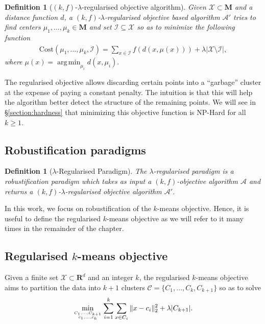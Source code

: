 \documentclass[12pt]{article}
\newcommand{\mc}{\mathcal}
\newcommand{\mb}{\mathbf}
\DeclareMathOperator*{\argmin}{arg\,min}
\newtheorem{definition}[theorem]{Definition}
\begin{document}
\begin{definition}[$(k, f)$-$\lambda$-regularised objective algorithm] Given $\mc X\subset \mb M$ and a distance function $d$, a $(k, f)$-$\lambda$-regularised objective based algorithm $\mc A'$ tries to find centers $\mu_1, \ldots, \mu_k \in \mb M$ and set $\mc I\subseteq \mc X$ so as to minimize the following function
\begin{align}
\label{eqn:kfObjectiveAlg}
\text{Cost}(\mu_1, \ldots, \mu_k, \mc I) = \sum_{x\in \mc I} f(d(x, \mu(x))) + \lambda |\mc X \setminus \mc I|,
\end{align}
where $\mu(x) = \argmin_{\mu_i} d(x, \mu_i).$
\end{definition}

The regularised objective allows discarding certain points into a ``garbage'' cluster at the expense of paying a constant penalty. The intuition is that this will help the algorithm better detect the structure of the remaining points. We will see in \S \ref{section:hardness} that minimizing this objective function is NP-Hard for all $k \ge 1$.

\subsection{Robustification paradigms}
\begin{definition}[$\lambda$-Regularised Paradigm] The $\lambda$-regularised paradigm is a robustification paradigm which takes as input a $(k, f)$-objective algorithm $\mc A$ and returns a $(k, f)$-$\lambda$-regularised objective algorithm $\mc A'$.  
\end{definition}

In this work, we focus on robustification of the $k$-means objective. Hence, it is useful to define the regularised $k$-means objective as we will refer to it many times in the remainder of the chapter. 

\subsection{Regularised $k$-means objective}
Given a finite set $\mc X \subset \mb R^{d}$ and an integer $k$, the regularised $k$-means objective aims to partition the data into $k+1$ clusters $\mc C = \{C_1, \ldots, C_{k}, C_{k+1}\}$ so as to solve 
\begin{align}
	\min_{C_1,\ldots, C_{k+1} \atop c_1, \ldots, c_k} \sum_{i=1}^k \sum_{x \in C_i} \|x-c_i\|_2^2 + \lambda |C_{k+1}|.
	\label{eqn:modifiedkmeans}
\end{align}
\end{document}
